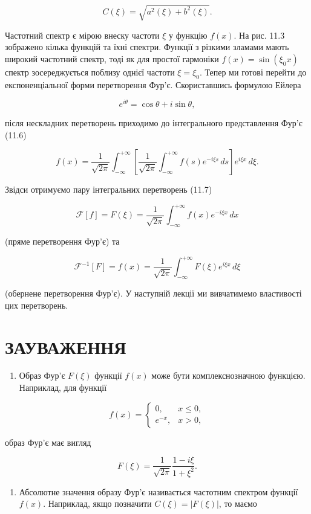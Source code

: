 \documentclass[
  ukrainian,
]{article}
\providecommand{\tightlist}{%
  \setlength{\itemsep}{0pt}\setlength{\parskip}{0pt}}
\begin{document}
\[
C(\xi) = \sqrt{a^2(\xi) + b^2(\xi)}.
\]

Частотний спектр є мірою внеску частоти \(\xi\) у функцію \(f(x)\). На
рис. 11.3 зображено кілька функцій та їхні спектри. Функції з різкими
зламами мають широкий частотний спектр, тоді як для простої гармоніки
\(f(x)=\sin(\xi_0 x)\) спектр зосереджується поблизу однієї частоти
\(\xi=\xi_0\). Тепер ми готові перейти до експоненціальної форми
перетворення Фур'є. Скориставшись формулою Ейлера

\[
e^{i\theta} = \cos\theta + i\sin\theta,
\]

після нескладних перетворень приходимо до інтегрального представлення
Фур'є (11.6)

\[
f(x) = \frac{1}{\sqrt{2\pi}} \int_{-\infty}^{+\infty}
\left[\frac{1}{\sqrt{2\pi}} \int_{-\infty}^{+\infty} f(s)e^{-i\xi s}\,ds \right]
e^{i\xi x}\,d\xi.
\]

Звідси отримуємо пару інтегральних перетворень (11.7)

\[
\mathcal{F}[f] = F(\xi) = \frac{1}{\sqrt{2\pi}} \int_{-\infty}^{+\infty} f(x)e^{-i\xi x}\,dx
\]

(пряме перетворення Фур'є) та

\[
\mathcal{F}^{-1}[F] = f(x) = \frac{1}{\sqrt{2\pi}} \int_{-\infty}^{+\infty} F(\xi)e^{i\xi x}\,d\xi
\]

(обернене перетворення Фур'є). У наступній лекції ми вивчатимемо
властивості цих перетворень.

\section{ЗАУВАЖЕННЯ}\label{ux437ux430ux443ux432ux430ux436ux435ux43dux43dux44f-7}

\begin{enumerate}
\def\labelenumi{\arabic{enumi}.}
\tightlist
\item
  Образ Фур'є \(F(\xi)\) функції \(f(x)\) може бути комплекснозначною
  функцією. Наприклад, для функції
\end{enumerate}

\[
f(x)=
\begin{cases}
0, & x \le 0,\\
e^{-x}, & x > 0,
\end{cases}
\]

образ Фур'є має вигляд

\[
F(\xi) = \frac{1}{\sqrt{2\pi}} \frac{1-i\xi}{1+\xi^2}.
\]

\begin{enumerate}
\def\labelenumi{\arabic{enumi}.}
\setcounter{enumi}{1}
\tightlist
\item
  Абсолютне значення образу Фур'є називається частотним спектром функції
  \(f(x)\). Наприклад, якщо позначити \(C(\xi)=|F(\xi)|\), то маємо
\end{enumerate}
\end{document}
